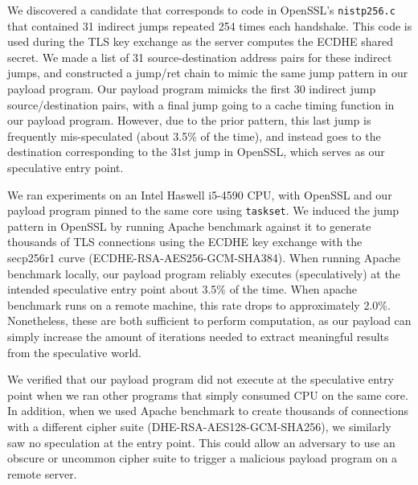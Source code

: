 We discovered a candidate that corresponds to code in OpenSSL's
\texttt{nistp256.c} that contained 31 indirect jumps repeated 254 times each
handshake. This code is used during the TLS key exchange as the server computes
the ECDHE shared secret. We made a list of 31 source-destination address pairs
for these indirect jumps, and constructed a jump/ret chain to mimic the same
jump pattern in
our payload program. Our payload program mimicks the first 30 indirect jump
source/destination pairs, with a final jump going to a cache timing function
in our payload program. However, due to the prior pattern, this last jump is
frequently mis-speculated (about 3.5\% of the time), and instead goes to the
destination corresponding to the 31st jump in OpenSSL, which serves as our
speculative entry point.


We ran experiments on an Intel Haswell
i5-4590 CPU, with OpenSSL and our payload program pinned to the same core using
\texttt{taskset}.
We induced the jump pattern in OpenSSL by running Apache benchmark against it to
generate thousands of TLS connections using the ECDHE key exchange with the
secp256r1 curve (ECDHE-RSA-AES256-GCM-SHA384). When running Apache benchmark locally, our payload program
reliably executes (speculatively) at the intended speculative entry point
about 3.5\% of the time. When apache benchmark runs on a remote
machine, this rate drops to approximately 2.0\%. Nonetheless, these are both
sufficient to perform computation, as our payload can simply increase the amount
of iterations needed to extract meaningful results from the speculative world.

We verified that our payload program did not execute at the speculative entry
point when we ran
other programs that simply consumed CPU on the same core. In addition, when we used
Apache benchmark to create thousands of connections with a different cipher
suite (DHE-RSA-AES128-GCM-SHA256), we similarly saw no speculation at the entry point. This
could allow an adversary to use an obscure or uncommon cipher suite to trigger a
malicious \speculake payload program on a remote server.

